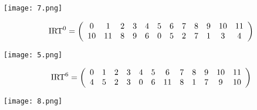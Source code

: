 	\begin{center}
		\texttt{[image: 7.png]}
	\end{center}
	\bigskip\bigskip
	\[\mbox{IRT}^0=\left(\begin{array}{*{12}c}0&1&2&3&4&5&6&7&8&9&10&11\\10&11&8&9&6&0&5&2&7&1&3&4\\\end{array}\right)\]
	\begin{center}
		\texttt{[image: 5.png]}
	\end{center}
	\bigskip\bigskip
	\[\mbox{IRT}^6=\left(\begin{array}{*{12}c}0&1&2&3&4&5&6&7&8&9&10&11\\4&5&2&3&0&6&11&8&1&7&9&10\\\end{array}\right)\]
	\begin{center}
		\texttt{[image: 8.png]}
	\end{center}